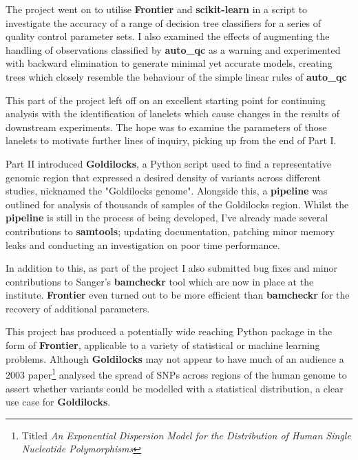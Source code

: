 The project went on to utilise \textbf{Frontier} and \textbf{scikit-learn} in a
script to investigate the accuracy of a range of decision tree classifiers for a
series of quality control parameter sets. I also examined the effects of
augmenting the handling of observations classified by \textbf{auto\_qc} as a
warning and experimented with backward elimination to generate minimal yet
accurate models, creating trees which closely resemble the behaviour of the
simple linear rules of \textbf{auto\_qc}

This part of the project left off on an excellent starting point for continuing
analysis with the identification of lanelets which cause changes in the results
of downstream experiments. The hope was to examine the parameters of those
lanelets to motivate further lines of inquiry, picking up from the end of Part
I.

Part II introduced \textbf{Goldilocks}, a Python script used to find a
representative genomic region that expressed a desired density of variants
across different studies, nicknamed the "Goldilocks genome". Alongside this, a
\textbf{pipeline} was outlined for analysis of thousands of samples of the
Goldilocks region. Whilst the \textbf{pipeline} is still in the process of being
developed, I've already made several contributions to \textbf{samtools};
updating documentation, patching minor memory leaks and conducting an
investigation on poor time performance.

In addition to this, as part of the project I also submitted bug fixes and
minor contributions to Sanger's \textbf{bamcheckr} tool which are now in place
at the institute. \textbf{Frontier} even turned out to be more efficient than
\textbf{bamcheckr} for the recovery of additional parameters.

This project has produced a potentially wide reaching Python package in
the form of \textbf{Frontier}, applicable to a variety of statistical or machine
learning problems. Although \textbf{Goldilocks} may not appear to have much of
an audience a 2003 paper\citep{kendal2003exponential}\footnote{Titled \textit{An Exponential
Dispersion Model for the Distribution of Human Single Nucleotide
Polymorphisms}\citep{kendal2003exponential}} analysed the spread of SNPs
across regions of the human genome to assert whether variants could be modelled
with a statistical distribution, a clear use case for \textbf{Goldilocks}.









